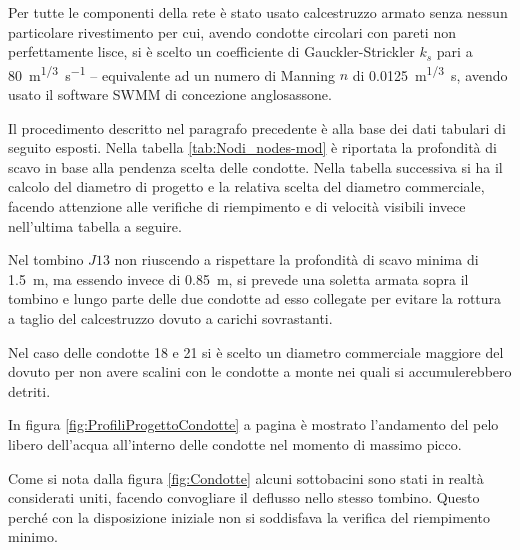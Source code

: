 Per tutte le componenti della rete è stato usato calcestruzzo armato senza nessun particolare rivestimento per cui, avendo condotte circolari con pareti non perfettamente lisce, si è scelto un coefficiente di Gauckler-Strickler $k_s$ pari a \SI{80}{\metre\tothe{1/3}\per\second} -- equivalente ad un numero di Manning $n$ di \SI{0.0125}{\metre\tothe{1/3}\second}, avendo usato il software SWMM di concezione anglosassone.

Il procedimento descritto nel paragrafo precedente è alla base dei dati tabulari di seguito esposti.  
Nella tabella \ref{tab:Nodi_nodes-mod} è riportata la profondità di scavo in base alla pendenza scelta delle condotte. 
Nella tabella successiva si ha il calcolo del diametro di progetto e la relativa scelta del diametro commerciale, facendo attenzione alle verifiche di riempimento e di velocità visibili invece nell'ultima tabella a seguire.

Nel tombino $J13$ non riuscendo a rispettare la profondità di scavo minima di \SI{1.5}{\metre}, ma essendo invece di \SI{0.85}{\metre}, si prevede una soletta armata sopra il tombino e lungo parte delle due condotte ad esso collegate per evitare la rottura a taglio del calcestruzzo dovuto a carichi sovrastanti. 

Nel caso delle condotte 18 e 21 si è scelto un diametro commerciale maggiore del dovuto per non avere scalini con le condotte a monte nei quali si accumulerebbero detriti. 

In figura \ref{fig:ProfiliProgettoCondotte} a pagina \pageref{fig:ProfiliProgettoCondotte} è mostrato l'andamento del pelo libero dell'acqua all'interno delle condotte nel momento di massimo picco.

Come si nota dalla figura \ref{fig:Condotte} alcuni sottobacini sono stati in realtà considerati uniti, facendo convogliare il deflusso nello stesso tombino.
Questo perché con la disposizione iniziale non si soddisfava la verifica del riempimento minimo.

